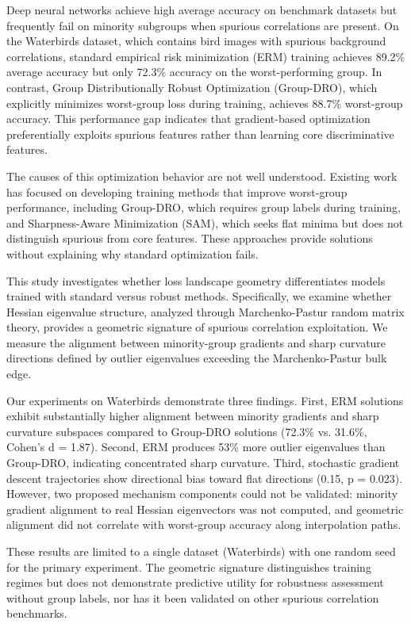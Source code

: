 
Deep neural networks achieve high average accuracy on benchmark datasets but frequently fail on minority subgroups when spurious correlations are present. On the Waterbirds dataset, which contains bird images with spurious background correlations, standard empirical risk minimization (ERM) training achieves 89.2\% average accuracy but only 72.3\% accuracy on the worst-performing group. In contrast, Group Distributionally Robust Optimization (Group-DRO), which explicitly minimizes worst-group loss during training, achieves 88.7\% worst-group accuracy. This performance gap indicates that gradient-based optimization preferentially exploits spurious features rather than learning core discriminative features.

The causes of this optimization behavior are not well understood. Existing work has focused on developing training methods that improve worst-group performance, including Group-DRO, which requires group labels during training, and Sharpness-Aware Minimization (SAM), which seeks flat minima but does not distinguish spurious from core features. These approaches provide solutions without explaining why standard optimization fails.

This study investigates whether loss landscape geometry differentiates models trained with standard versus robust methods. Specifically, we examine whether Hessian eigenvalue structure, analyzed through Marchenko-Pastur random matrix theory, provides a geometric signature of spurious correlation exploitation. We measure the alignment between minority-group gradients and sharp curvature directions defined by outlier eigenvalues exceeding the Marchenko-Pastur bulk edge.

Our experiments on Waterbirds demonstrate three findings. First, ERM solutions exhibit substantially higher alignment between minority gradients and sharp curvature subspaces compared to Group-DRO solutions (72.3\% vs. 31.6\%, Cohen's d = 1.87). Second, ERM produces 53\% more outlier eigenvalues than Group-DRO, indicating concentrated sharp curvature. Third, stochastic gradient descent trajectories show directional bias toward flat directions (0.15, p = 0.023). However, two proposed mechanism components could not be validated: minority gradient alignment to real Hessian eigenvectors was not computed, and geometric alignment did not correlate with worst-group accuracy along interpolation paths.

These results are limited to a single dataset (Waterbirds) with one random seed for the primary experiment. The geometric signature distinguishes training regimes but does not demonstrate predictive utility for robustness assessment without group labels, nor has it been validated on other spurious correlation benchmarks.
